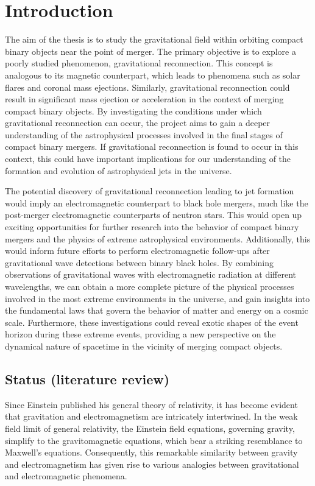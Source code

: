 \chapter{Introduction}

The aim of the thesis is to study the gravitational field within orbiting compact binary objects near the point of merger. The primary objective is to explore a poorly studied  phenomenon, gravitational reconnection. This concept is analogous to its magnetic counterpart, which leads to phenomena such as solar flares and coronal mass ejections. Similarly, gravitational reconnection could result in significant mass ejection or acceleration in the context of merging compact binary objects. By investigating the conditions under which gravitational reconnection can occur, the project aims to gain a deeper understanding of the astrophysical processes involved in the final stages of compact binary mergers. If gravitational reconnection is found to occur in this context, this could have important implications for our understanding of the formation and evolution of astrophysical jets in the universe.

The potential discovery of gravitational reconnection leading to jet formation would imply an electromagnetic counterpart to black hole mergers, much like the post-merger electromagnetic counterparts of neutron stars. This would open up exciting opportunities for further research into the behavior of compact binary mergers and the physics of extreme astrophysical environments. Additionally, this would inform future efforts to perform electromagnetic follow-ups after gravitational wave detections between binary black holes. By combining observations of gravitational waves with electromagnetic radiation at different wavelengths, we can obtain a more complete picture of the physical processes involved in the most extreme environments in the universe, and gain insights into the fundamental laws that govern the behavior of matter and energy on a cosmic scale. Furthermore, these investigations could reveal exotic shapes of the event horizon during these extreme events, providing a new perspective on the dynamical nature of spacetime in the vicinity of merging compact objects.

\section{Status (literature review)}


Since Einstein published his general theory of relativity, it has become evident that gravitation and electromagnetism are intricately intertwined. In the weak field limit of general relativity, the Einstein field equations, governing gravity, simplify to the gravitomagnetic equations, which bear a striking resemblance to Maxwell's equations. Consequently, this remarkable similarity between gravity and electromagnetism has given rise to various analogies between gravitational and electromagnetic phenomena. 

